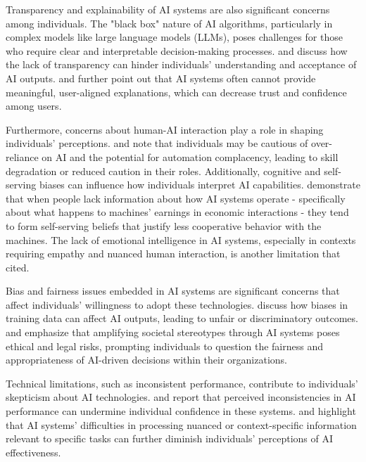 Transparency and explainability of AI systems are also significant concerns among individuals. The "black box" nature of AI algorithms, particularly in complex models like large language models (LLMs), poses challenges for those who require clear and interpretable decision-making processes. \cite{Novak2022} and \cite{Haxvig2024} discuss how the lack of transparency can hinder individuals' understanding and acceptance of AI outputs. \cite{Lai2023} and \cite{Morais2023} further point out that AI systems often cannot provide meaningful, user-aligned explanations, which can decrease trust and confidence among users.

Furthermore, concerns about human-AI interaction play a role in shaping individuals' perceptions. \cite{Qian2024} and \cite{Bucinca2021} note that individuals may be cautious of over-reliance on AI and the potential for automation complacency, leading to skill degradation or reduced caution in their roles. Additionally, cognitive and self-serving biases can influence how individuals interpret AI capabilities. \cite{vonSchenk2023} demonstrate that when people lack information about how AI systems operate - specifically about what happens to machines' earnings in economic interactions - they tend to form self-serving beliefs that justify less cooperative behavior with the machines. The lack of emotional intelligence in AI systems, especially in contexts requiring empathy and nuanced human interaction, is another limitation that \cite{Singh2023} cited.

Bias and fairness issues embedded in AI systems are significant concerns that affect individuals' willingness to adopt these technologies. \cite{Muller2022} discuss how biases in training data can affect AI outputs, leading to unfair or discriminatory outcomes. \cite{Allan2024} and \cite{zhou2023teaching} emphasize that amplifying societal stereotypes through AI systems poses ethical and legal risks, prompting individuals to question the fairness and appropriateness of AI-driven decisions within their organizations.

Technical limitations, such as inconsistent performance, contribute to individuals' skepticism about AI technologies. \cite{Muller2022} and \cite{Lin2024} report that perceived inconsistencies in AI performance can undermine individual confidence in these systems. \cite{Pinto2024} and \cite{Biswas2023} highlight that AI systems' difficulties in processing nuanced or context-specific information relevant to specific tasks can further diminish individuals' perceptions of AI effectiveness.

